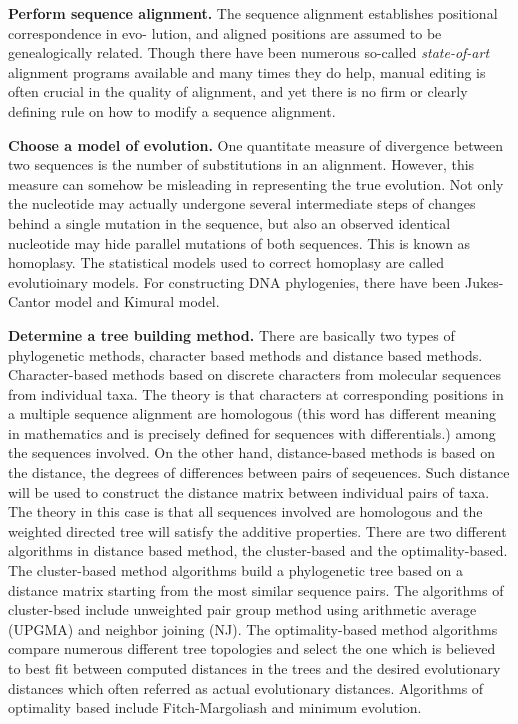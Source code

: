 \textbf{Perform sequence alignment.}
 The sequence alignment establishes positional correspondence 
 in evo- lution, and aligned positions are assumed to be 
 genealogically related. Though there have been numerous 
 so-called \textit{state-of-art} alignment programs available and 
 many times they do help, manual editing is often
 crucial in the quality of alignment, and yet there is 
 no firm or clearly defining rule on how to modify a 
 sequence alignment. 
 
 
 \textbf{Choose a model of evolution.}
  One quantitate measure of divergence between two 
  sequences is the number of substitutions in an alignment. 
  However, this measure can somehow be misleading in 
  representing the true evolution. Not only the nucleotide 
  may actually undergone several intermediate steps of 
  changes behind a single mutation in the sequence, but 
  also an observed identical nucleotide may hide parallel 
  mutations of both sequences. This is known as homoplasy. 
  The statistical models used to correct homoplasy are 
  called evolutioinary models. For constructing DNA 
  phylogenies, there have been Jukes-Cantor model and 
  Kimural model.
  
 
\textbf{Determine a tree building method.}
 There are basically two types of phylogenetic 
 methods, character based methods and distance 
 based methods. Character-based methods based on 
 discrete characters from molecular sequences from 
 individual taxa. The theory is that characters at 
 corresponding positions in a multiple sequence 
 alignment are homologous (this word has different 
 meaning in mathematics and is precisely defined for 
 sequences with differentials.) among the sequences 
 involved. On the other hand, distance-based methods is 
 based on the distance, the degrees of differences between 
 pairs of seqeuences. Such distance will be used to construct 
 the distance matrix between individual pairs of taxa. 
 The theory in this case is that all sequences involved 
 are homologous and the weighted directed tree will 
 satisfy the additive properties. There are two different 
 algorithms in distance based method, the cluster-based 
 and the optimality-based. The cluster-based method 
 algorithms build a phylogenetic tree based on a distance 
 matrix starting from the most similar sequence pairs. 
 The algorithms of cluster-bsed include unweighted pair 
 group method using arithmetic average (UPGMA) and 
 neighbor joining (NJ). The optimality-based method 
 algorithms compare numerous different tree topologies 
 and select the one which is believed to best fit between 
 computed distances in the trees and the desired 
 evolutionary distances which often referred as actual 
 evolutionary distances. Algorithms of optimality based 
 include Fitch-Margoliash and minimum evolution. 
